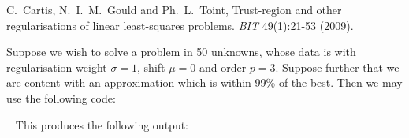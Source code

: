 \documentclass{galahad}
\begin{document}
\noindent
C.\ Cartis, N.\ I.\ M.\ Gould and Ph.\ L.\ Toint,
Trust-region and other regularisations of linear
least-squares problems.
{\em BIT} 49(1):21-53 (2009).


\galexample
Suppose we wish to solve a problem in 50 unknowns, whose data is
with regularisation weight $\sigma = 1$, shift $\mu = 0$ and order $p = 3$.
Suppose further that we are content with
an approximation which is within 99\% of the best.
Then we may use the following code:

{\tt \small
\VerbatimInput{\packageexample}
}
\noindent
This produces the following output:
{\tt \small
\VerbatimInput{\packageresults}
}
\end{document}
